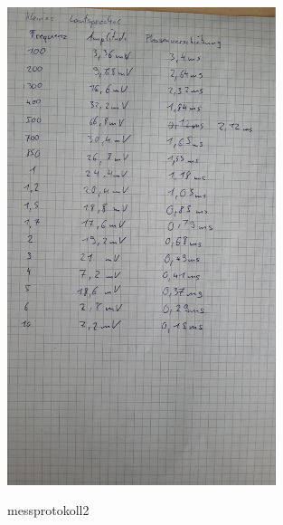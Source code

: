 \documentclass[TGAI_Laborbericht.tex]{subfiles}
\begin{document}
\begin{figure}[H]
	\includegraphics[width=0.7\textwidth]{media/messprotokoll2.jpg}
	\label{messprotokoll2}
	\caption{messprotokoll2}
\end{figure}

%
%

\clearpage
\end{document}
